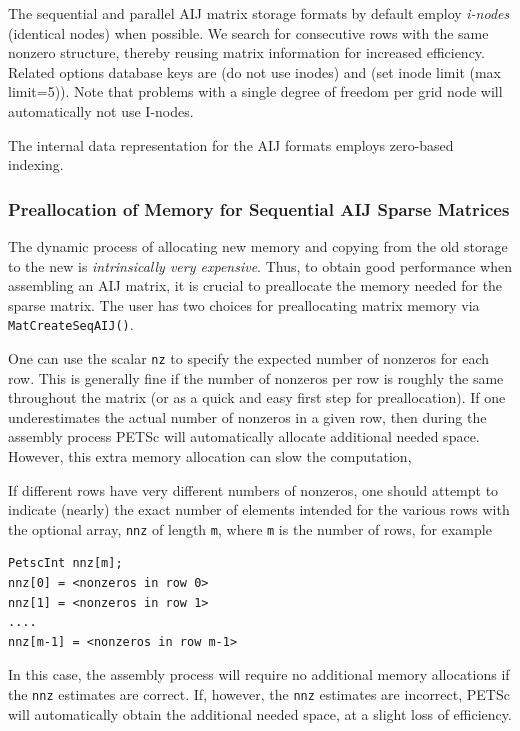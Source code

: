 The sequential and parallel AIJ matrix storage formats by default
employ {\em i-nodes} (identical nodes) when possible.  We search for
consecutive rows with the same nonzero structure, thereby reusing
matrix information for increased efficiency.  Related options database
keys are  (do not use inodes) and  (set inode limit (max limit=5)).
Note that problems with a single degree of freedom per grid node
will automatically not use I-nodes.

The internal data representation for the AIJ formats employs
zero-based indexing. 

\subsubsection{Preallocation of Memory for Sequential AIJ Sparse Matrices}

The dynamic process of allocating new memory and copying from the old
storage to the new is {\em intrinsically very expensive}.  Thus, to
obtain good performance when assembling an AIJ matrix, it is crucial
to preallocate the memory needed for the sparse matrix.  The user has
two choices for preallocating matrix memory via \lstinline{MatCreateSeqAIJ()}.

One can use the scalar \lstinline{nz} to specify the expected
number of nonzeros for each row.  This is generally fine if the number
of nonzeros per row is roughly the same throughout the matrix (or as a
quick and easy first step for preallocation).  If one underestimates
the actual number of nonzeros in a given row, then during the assembly
process PETSc will automatically allocate additional needed space.
However, this extra memory allocation can slow the computation,

If different rows have very different numbers of nonzeros, one
should attempt to indicate (nearly) the exact number of elements
intended for the various rows with the optional array, \lstinline{nnz} of
length \lstinline{m}, where \lstinline{m} is the number of rows, for example
\begin{lstlisting}
PetscInt nnz[m];
nnz[0] = <nonzeros in row 0>
nnz[1] = <nonzeros in row 1>
....
nnz[m-1] = <nonzeros in row m-1>
\end{lstlisting}
In this case, the assembly process will require no additional memory
allocations if the \lstinline{nnz} estimates are correct. If, however,
the \lstinline{nnz} estimates are incorrect, PETSc will automatically
obtain the additional needed space, at a slight loss of efficiency.

